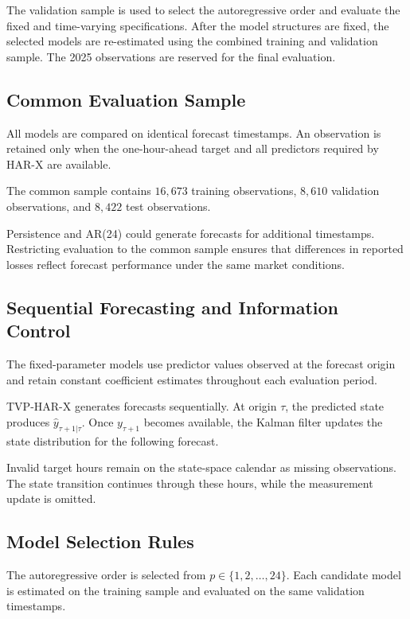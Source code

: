 The validation sample is used to select the autoregressive
order and evaluate the fixed and time-varying specifications.
After the model structures are fixed, the selected models are
re-estimated using the combined training and validation
sample. The 2025 observations are reserved for the final
evaluation.

\subsection{Common Evaluation Sample}

All models are compared on identical forecast timestamps. An
observation is retained only when the one-hour-ahead target and
all predictors required by HAR-X are available.

The common sample contains \(16{,}673\) training observations,
\(8{,}610\) validation observations, and \(8{,}422\) test
observations.

Persistence and AR(24) could generate forecasts for additional
timestamps. Restricting evaluation to the common sample ensures
that differences in reported losses reflect forecast
performance under the same market conditions.

\subsection{Sequential Forecasting and Information Control}

The fixed-parameter models use predictor values observed at the
forecast origin and retain constant coefficient estimates
throughout each evaluation period.

TVP-HAR-X generates forecasts sequentially. At origin
\(\tau\), the predicted state produces
\(\widehat{y}_{\tau+1|\tau}\). Once \(y_{\tau+1}\) becomes
available, the Kalman filter updates the state distribution for
the following forecast.

Invalid target hours remain on the state-space calendar as
missing observations. The state transition continues through
these hours, while the measurement update is omitted.

\subsection{Model Selection Rules}

The autoregressive order is selected from
\(p\in\{1,2,\ldots,24\}\). Each candidate model is estimated on
the training sample and evaluated on the same validation
timestamps.

